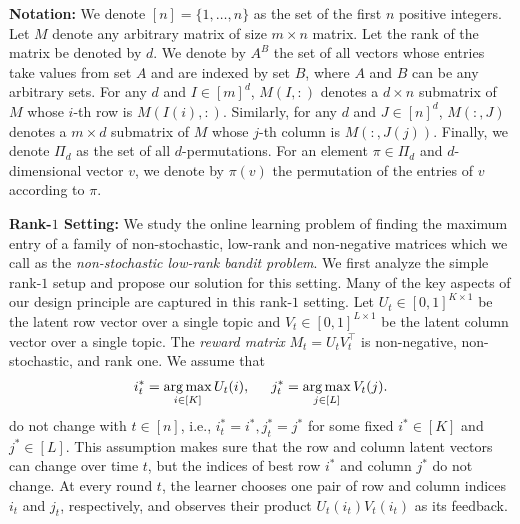 
\newcommand{\transpose}{^\mathsf{\scriptscriptstyle T}}
\textbf{Notation:} We denote $[n] = \{1, \dots, n\}$ as the set of the first $n$ positive integers. Let $M$ denote any arbitrary matrix of size $m \times n$ matrix. Let the rank of the matrix be denoted by $d$. We denote by $A^B$ the set of all vectors whose entries take values from set $A$ and are indexed by set $B$, where $A$ and $B$ can be any arbitrary sets. For any $d$ and $I \in [m]^d$, $M(I, :)$ denotes a $d \times n$ submatrix of $M$ whose $i$-th row is $M(I(i), :)$. Similarly, for any $d$ and $J \in [n]^d$, $M(:, J)$ denotes a $m \times d$ submatrix of $M$ whose $j$-th column is $M(:, J(j))$. Finally, we denote $\Pi_d$ as the set of all $d$-permutations. For an element $\pi \in \Pi_d$ and $d$-dimensional vector $v$, we denote by $\pi(v)$ the permutation of the entries of $v$ according to $\pi$.

\textbf{Rank-$1$ Setting:} We study the online learning problem of finding the maximum entry of a family of non-stochastic, low-rank and non-negative matrices  which we call as the \emph{non-stochastic low-rank bandit problem}. We first analyze the simple rank-$1$ setup and propose our solution for this setting. Many of the key aspects of our design principle are captured in this rank-$1$ setting. Let $U_t\in [0,1]^{K\times 1}$ be the latent row vector over a single topic and $V_t \in [0,1]^{L\times 1}$ be the latent column vector over a single topic. The \emph{reward matrix} $M_t = U_tV_t^{\intercal}$ is non-negative, non-stochastic, and rank one. We assume that
\begin{align}
  i^\ast_t = \mathop{\rm arg\,max}_{i \in [K]} U_t(i), \hspace{1.5em}
  j^\ast_t = \mathop{\rm arg\,max}_{j \in [L]} V_t(j) \label{eq:rank1ij}.
\end{align}
do not change with $t \in [n]$, i.e., $ i^\ast_t  = i^\ast, j^\ast_t = j^\ast$ for some fixed $i^\ast \in [K]$ and $j^\ast \in [L]$. This assumption makes sure that the row and column latent vectors can change over time $t$, but the indices of best row $i^*$ and column $j^*$ do not change. At every round $t$, the learner chooses one pair of row and column indices $i_t$ and $j_t$, respectively, and observes their product $U_t(i_t)V_t(i_t)$ as its feedback.

